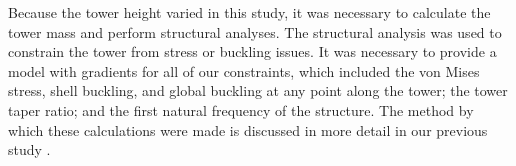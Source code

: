 Because the tower height varied in this study, it was necessary to calculate the tower mass and perform structural analyses.
The structural analysis was used to constrain the tower from stress or buckling issues. 
It was necessary to provide a model with gradients for all of our constraints, which included the von Mises stress, shell buckling, and global buckling at any point along the tower; the tower taper ratio; and the first natural frequency of the structure. The method by which these calculations were made is discussed in more detail in our previous study \citep{stanley2018}.